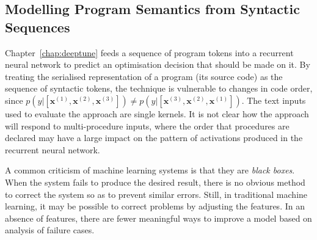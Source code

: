 



\subsection{Modelling Program Semantics from Syntactic Sequences}

Chapter~\ref{chap:deeptune} feeds a sequence of program tokens into a recurrent neural network to predict an optimisation decision that should be made on it. By treating the serialised representation of a program (its source code) as the sequence of syntactic tokens, the technique is vulnerable to changes in code order, since $p(y|[\bm{x}^{(1)}, \bm{x}^{(2)}, \bm{x}^{(3)}]) \ne p(y|[\bm{x}^{(3)}, \bm{x}^{(2)}, \bm{x}^{(1)}])$. The text inputs used to evaluate the approach are single kernels. It is not clear how the approach will respond to multi-procedure inputs, where the order that procedures are declared may have a large impact on the pattern of activations produced in the recurrent neural network.




A common criticism of machine learning systems is that they are \emph{black boxes}. When the system fails to produce the desired result, there is no obvious method to correct the system so as to prevent similar errors. Still, in traditional machine learning, it may be possible to correct problems by adjusting the features. In an absence of features, there are fewer meaningful ways to improve a model based on analysis of failure cases.


